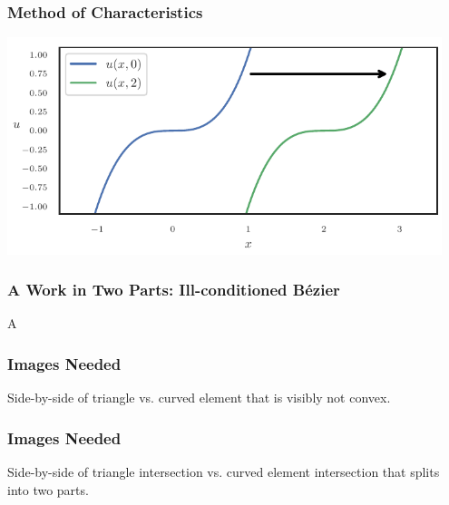 \documentclass{beamer}
\begin{document}
\begin{frame}
\frametitle{Method of Characteristics}
\begin{center}
\includegraphics[width=0.95\textwidth]
                {../images/solution-transfer/simple_transport.pdf}
\end{center}
\end{frame}

\begin{frame}
\frametitle{A Work in Two Parts: Ill-conditioned B\'{e}zier}
A
\end{frame}


\begin{frame}
\frametitle{Images Needed}
Side-by-side of triangle vs. curved element that is visibly
not convex.
\end{frame}

\begin{frame}
\frametitle{Images Needed}
Side-by-side of triangle intersection vs. curved element intersection
that splits into two parts.
\end{frame}
\end{document}
